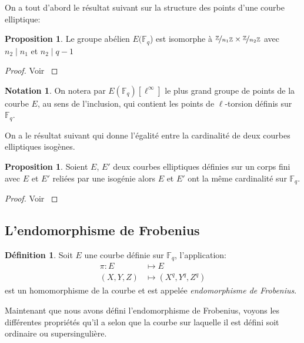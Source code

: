 \documentclass[10pt,a4paper]{book}
\theoremstyle{plain}
\theoremstyle{definition}
\theoremstyle{definition}
\theoremstyle{definition}
\theoremstyle{definition}
\newtheorem{prop}[thm]{Proposition}
\theoremstyle{definition}
\newtheorem{defi}[thm]{Définition}
\theoremstyle{remark}
\theoremstyle{remark}
\theoremstyle{definition}
\newtheorem{nota}[thm]{Notation}
\begin{document}
On a tout d'abord le résultat suivant sur la structure des points d'une courbe elliptique:
\begin{prop}
Le groupe abélien $E(\mathbb{F}_q$) est isomorphe à $\nicefrac{\mathbb{Z}}{n_1 \mathbb{Z}} \times \nicefrac{\mathbb{Z}}{n_2 \mathbb{Z}}$ avec $n_2 \mid n_1$ et $n_2 \mid q-1$
\end{prop}

\begin{proof}
Voir \cite[Theorem 4.1]{Washington2008}
\end{proof}

\begin{nota}
On notera par $E(\mathbb{F}_q)[\ell^{\infty}]$ le plus grand groupe de points 
de la courbe $E$, au sens de l'inclusion, qui contient les points de 
$\ell$-torsion définis sur $\mathbb{F}_q$.
\end{nota}

On a le résultat suivant qui donne l'égalité entre la cardinalité de deux courbes elliptiques isogènes.

\begin{prop}
\label{pro:iso:ega}
Soient $E$, $E'$ deux courbes elliptiques définies sur un corps fini avec $E$ et $E'$ reliées par une isogénie alors $E$ et $E'$ ont la même cardinalité sur $\mathbb{F}_q$.
\end{prop}

\begin{proof}
Voir \cite[Exercise V.5.4.a]{Silv1}
\end{proof}

\subsection{L'endomorphisme de Frobenius}
\begin{defi}
Soit $E$ une courbe définie sur $\mathbb{F}_q$, l'application: 
\begin{equation*}
\begin{alignedat}{1}
\pi :E &\mapsto  E  \\
 (X,Y,Z)  &\mapsto (X^q,Y^q,Z^q)  
\end{alignedat}
\end{equation*}
est un homomorphisme de la courbe et est appelée \emph{endomorphisme de Frobenius}. 
\end{defi}

Maintenant que nous avons défini l'endomorphisme de Frobenius, voyons les 
différentes propriétés qu'il a selon que la courbe sur laquelle il est défini 
soit ordinaire ou supersingulière.
\end{document}

